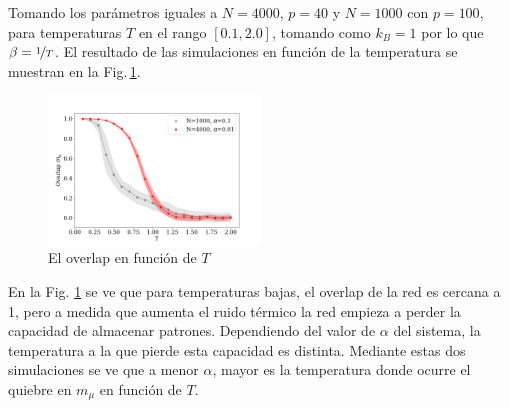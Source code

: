 Tomando los parámetros iguales a $N=4000$, $p=40$ y $N=1000$ con $p=100$,  para temperaturas $T$ en el rango $[0.1, 2.0]$, tomando como $k_B=1$ por lo que $\beta=\nicefrac{1}{T}$. El resultado de las simulaciones en función de la temperatura se muestran en la Fig.\,\ref{fig:T}.
\begin{figure}[H]
	\centering
	\includegraphics[width=0.5\textwidth]{../Graficos/beta2.png}
	\caption{El overlap en función de $T$}
	\label{fig:T}
\end{figure}
En la Fig. \ref{fig:T} se ve que para temperaturas bajas, el overlap de la red es cercana a 1, pero a medida que aumenta el ruido térmico la red empieza a perder la capacidad de almacenar  patrones.  Dependiendo del valor de $\alpha$ del sistema, la temperatura a la que pierde esta capacidad es distinta. Mediante estas dos simulaciones se ve que a menor $\alpha$, mayor es la temperatura donde ocurre el quiebre en $m_\mu$ en función de $T$. 

 



